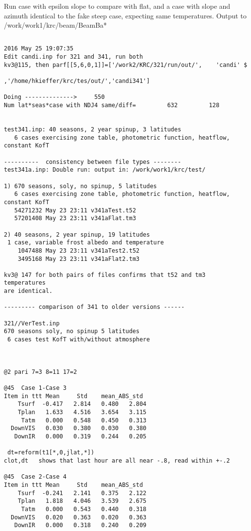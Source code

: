 Run case with epsilon slope to compare with flat, and a case with slope and azimuth identical to the fake steep case, expecting same temperatures. Output to /work/work1/krc/beam/BeamBa*
\vspace{-3.mm} 
\begin{verbatim}

2016 May 25 19:07:35
Edit candi.inp for 321 and 341, run both
kv3@115, then parf[[5,6,0,1]]=['/work2/KRC/321/run/out/',    'candi' $
                              ,'/home/hkieffer/krc/tes/out/','candi341']
 
Doing -------------->     550
Num lat*seas*case with NDJ4 same/diff=         632         128


test341.inp: 40 seasons, 2 year spinup, 3 latitudes
   6 cases exercising zone table, photometric function, heatflow, constant KofT

----------  consistency between file types --------
test341a.inp: Double run: output in: /work/work1/krc/test/

1) 670 seasons, soly, no spinup, 5 latitudes
   6 cases exercising zone table, photometric function, heatflow, constant KofT
   54271232 May 23 23:11 v341aTest.t52
   57201408 May 23 23:11 v341aFlat.tm3

2) 40 seasons, 2 year spinup, 19 latitudes
 1 case, variable frost albedo and temperature
    1047488 May 23 23:11 v341aTest2.t52
    3495168 May 23 23:11 v341aFlat2.tm3

kv3@ 147 for both pairs of files confirms that t52 and tm3 temperatures 
are identical.

--------- comparison of 341 to older versions ------

321//VerTest.inp
670 seasons soly, no spinup 5 latitudes
 6 cases test KofT with/without atmosphere



@2 pari 7=3 8=11 17=2

@45  Case 1-Case 3
Item in ttt Mean     Std    mean_ABS_std
    Tsurf  -0.417   2.814   0.480   2.804
    Tplan   1.633   4.516   3.654   3.115
     Tatm   0.000   0.548   0.450   0.313
  DownVIS   0.030   0.380   0.030   0.380
   DownIR   0.000   0.319   0.244   0.205

 dt=reform(t1[*,0,jlat,*])
clot,dt   shows that last hour are all near -.8, read within +-.2

@45  Case 2-Case 4
Item in ttt Mean     Std    mean_ABS_std
    Tsurf  -0.241   2.141   0.375   2.122
    Tplan   1.818   4.046   3.539   2.675
     Tatm   0.000   0.543   0.440   0.318
  DownVIS   0.020   0.363   0.020   0.363
   DownIR   0.000   0.318   0.240   0.209


\end{verbatim}
